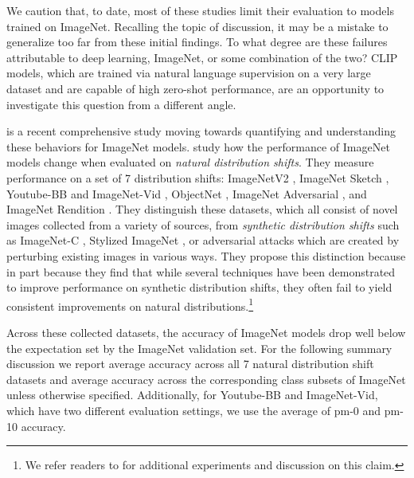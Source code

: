We caution that, to date, most of these studies limit their evaluation to models trained on ImageNet. Recalling the topic of discussion, it may be a mistake to generalize too far from these initial findings. To what degree are these failures attributable to deep learning, ImageNet, or some combination of the two? CLIP models, which are trained via natural language supervision on a very large dataset and are capable of high zero-shot performance, are an opportunity to investigate this question from a different angle.

\citet{taori2020measuring} is a recent comprehensive study moving towards quantifying and understanding these behaviors for ImageNet models. \citet{taori2020measuring} study how the performance of ImageNet models change when evaluated on \textit{natural distribution shifts}. They measure performance on a set of 7 distribution shifts: ImageNetV2 \citep{recht2019imagenet}, ImageNet Sketch \citep{wang2019learning}, Youtube-BB and ImageNet-Vid \citep{shankar2019image}, ObjectNet \citep{barbu2019objectnet}, ImageNet Adversarial \citep{hendrycks2019natural}, and ImageNet Rendition \citep{hendrycks2020many}. They distinguish these datasets, which all consist of novel images collected from a variety of sources, from \textit{synthetic distribution shifts} such as ImageNet-C \citep{hendrycks2019benchmarking}, Stylized ImageNet \citep{geirhos2018imagenet}, or adversarial attacks \citep{goodfellow2014explaining} which are created by perturbing existing images in various ways. They propose this distinction because in part because they find that while several techniques have been demonstrated to improve performance on synthetic distribution shifts, they often fail to yield consistent improvements on natural distributions.\footnote{We refer readers to \citet{hendrycks2020many} for additional experiments and discussion on this claim.}

Across these collected datasets, the accuracy of ImageNet models drop well below the expectation set by the ImageNet validation set. For the following summary discussion we report average accuracy across all 7 natural distribution shift datasets and average accuracy across the corresponding class subsets of ImageNet unless otherwise specified. Additionally, for Youtube-BB and ImageNet-Vid, which have two different evaluation settings, we use the average of pm-0 and pm-10 accuracy. 

